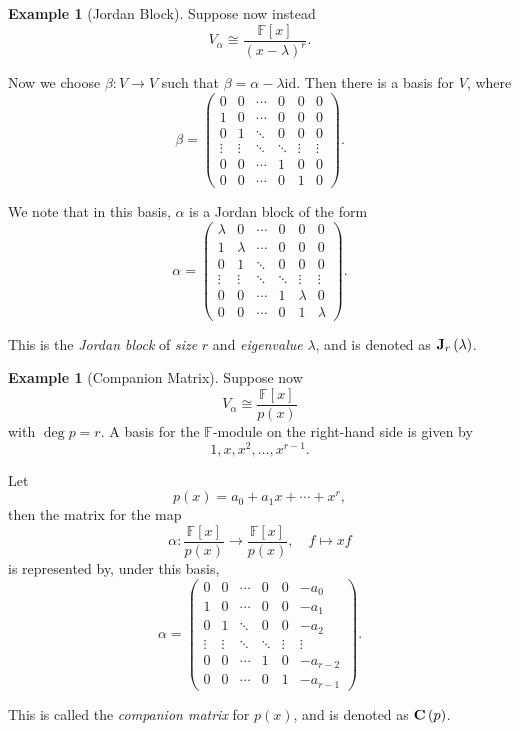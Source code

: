 \documentclass{article}
\theoremstyle{definition}
\newtheorem{example}[theorem]{Example}
\theoremstyle{remark}
\newcommand{\pqty}[1]{\left(#1\right)}
\newcommand{\bqty}[1]{\left[#1\right]}
\newcommand{\flatfrac}[2]{\frac{#1}{#2}}
\newcommand{\functiondomain}[3]{#1:#2\to #3}
\newcommand{\function}[5]{#1:#2\to #3,\quad #4\mapsto #5}
\newcommand{\pmqty}[1]{\begin{pmatrix}#1\end{pmatrix}}
\newcommand{\isomorphic}{\cong}
\newcommand{\identity}{\mathrm{id}}
\newcommand{\FF}{\mathbb{F}}
\begin{document}
\begin{example}[Jordan Block]
    \label{ex:jordan-block}%
    Suppose now instead
    \[
        V_{\alpha} \isomorphic \flatfrac{\FF\bqty{x}}{\pqty{x - \lambda}^r}.
    \]

    Now we choose \(\functiondomain{\beta}{V}{V}\) such that \(\beta = \alpha - \lambda \identity\). Then there is a basis for \(V\), where
    \[
        \beta = \pmqty{
            0 & 0 & \cdots & 0 & 0 & 0 \\
            1 & 0 & \cdots & 0 & 0 & 0 \\
            0 & 1 & \ddots & 0 & 0 & 0 \\
            \vdots & \vdots & \ddots & \ddots & \vdots & \vdots \\
            0 & 0 & \cdots & 1 & 0 & 0 \\
            0 & 0 & \cdots & 0 & 1 & 0
        }.
    \]

    We note that in this basis, \(\alpha\) is a Jordan block of the form
    \[
        \alpha = \pmqty{
            \lambda & 0 & \cdots & 0 & 0 & 0 \\
            1 & \lambda & \cdots & 0 & 0 & 0 \\
            0 & 1 & \ddots & 0 & 0 & 0 \\
            \vdots & \vdots & \ddots & \ddots & \vdots & \vdots \\
            0 & 0 & \cdots & 1 & \lambda & 0 \\
            0 & 0 & \cdots & 0 & 1 & \lambda
        }.
    \]

    This is the \emph{Jordan block} of \emph{size} \(r\) and \emph{eigenvalue} \(\lambda\), and is denoted as \(\vb{J}_{r} \pqty{\lambda}\).
\end{example}

\begin{example}[Companion Matrix]
    \label{ex:companion-matrix}%
    Suppose now
    \[
        V_{\alpha} \isomorphic \flatfrac{\FF\bqty{x}}{p\pqty{x}}
    \]
    with \(\deg p = r\). A basis for the \(\FF\)-module on the right-hand side is given by
    \[
        1, x, x^2, \ldots, x^{r - 1}.
    \]

    Let
    \[
        p\pqty{x} = a_0 + a_1 x + \cdots + x^r,
    \]
    then the matrix for the map
    \[
        \function{\alpha}{\flatfrac{\FF\bqty{x}}{p\pqty{x}}}{\flatfrac{\FF\bqty{x}}{p\pqty{x}}}{f}{xf}
    \]
    is represented by, under this basis,
    \[
        \alpha = \pmqty{
            0 & 0 & \cdots & 0 & 0 & - a_0 \\
            1 & 0 & \cdots & 0 & 0 & - a_1 \\
            0 & 1 & \ddots & 0 & 0 & - a_2 \\
            \vdots & \vdots & \ddots & \ddots & \vdots & \vdots \\
            0 & 0 & \cdots & 1 & 0 & - a_{r - 2} \\
            0 & 0 & \cdots & 0 & 1 & - a_{r - 1}
        }.
    \]

    This is called the \emph{companion matrix} for \(p\pqty{x}\), and is denoted as \(\vb{C}\pqty{p}\).
\end{example}
\end{document}
